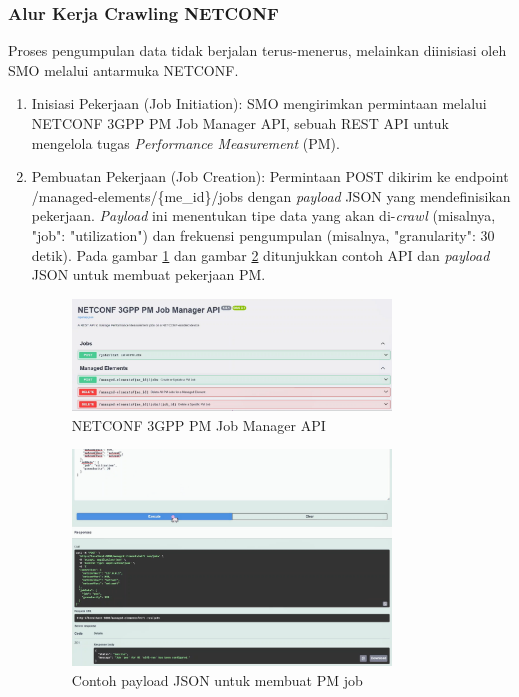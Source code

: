 \subsubsection{Alur Kerja Crawling NETCONF}
Proses pengumpulan data tidak berjalan terus-menerus, melainkan diinisiasi oleh SMO melalui antarmuka NETCONF.
\begin{enumerate}
    \item Inisiasi Pekerjaan (Job Initiation): SMO mengirimkan permintaan melalui NETCONF 3GPP PM Job Manager API, sebuah REST API untuk mengelola tugas \textit{Performance Measurement} (PM).
    \item Pembuatan Pekerjaan (Job Creation): Permintaan POST dikirim ke endpoint /managed-elements/\{me\_id\}/jobs dengan \textit{payload} JSON yang mendefinisikan pekerjaan. \textit{Payload} ini menentukan tipe data yang akan di-\textit{crawl} (misalnya, "job": "utilization") dan frekuensi pengumpulan (misalnya, "granularity": 30 detik). Pada gambar \ref{fig:netconf_api} dan gambar \ref{fig:json_payload} ditunjukkan contoh API dan \textit{payload} JSON untuk membuat pekerjaan PM.

\begin{figure}[htbp]
    \centering
    \includegraphics[width=0.8\textwidth]{assets/pics/netconf_api.png}
    \caption{NETCONF 3GPP PM Job Manager API}
    \label{fig:netconf_api}
\end{figure}

\begin{figure}[htbp]
    \centering
    \includegraphics[width=0.8\textwidth]{assets/pics/json_payload.png}
    \caption{Contoh payload JSON untuk membuat PM job}
    \label{fig:json_payload}
\end{figure}


\end{enumerate}
